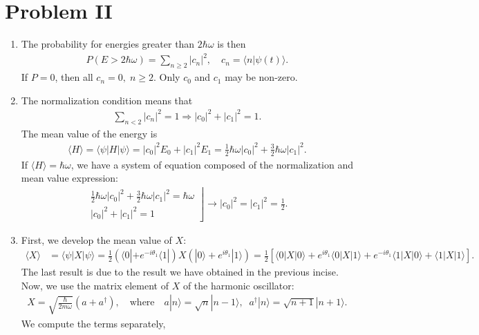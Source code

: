 \documentclass[letterpaper,11pt,twoside]{article}
\newcommand{\ket}[1]{|#1\rangle}
\newcommand{\bra}[1]{\langle#1|}
\newcommand{\braket}[1]{\langle#1\rangle}
\begin{document}
\section*{Problem II}
\begin{enumerate}
  \item The probability for energies greater than $2\hbar\omega$ is then
  \begin{align*}
    P(E>2\hbar\omega)=\sum_{n\geq2}|c_n|^2,\quad c_n=\braket{n|\psi(t)}.
  \end{align*}
  If $P=0$, then all $c_n=0,\;n\geq2$. Only $c_0$ and $c_1$ may be non-zero.
  \item The normalization condition means that 
  \begin{align*}
    \sum_{n<2}|c_n|^2=1\Longrightarrow |c_0|^2+|c_1|^2=1.
  \end{align*}
  The mean value of the energy is
  \begin{align*}
    \braket{H}=\braket{\psi|H|\psi}=|c_0|^2E_0+|c_1|^2E_1=\frac{1}{2}\hbar\omega|c_0|^2+\frac{3}{2}\hbar\omega|c_1|^2.
  \end{align*}
  If $\braket{H}=\hbar\omega$, we have a system of equation composed of the normalization and mean value expression:
  \begin{align*}
    \left.
    \begin{array}{l}
      \displaystyle\frac{1}{2}\hbar\omega|c_0|^2+\frac{3}{2}\hbar\omega|c_1|^2=\hbar\omega\\
      \displaystyle|c_0|^2+|c_1|^2=1
    \end{array}\right\rfloor\longrightarrow
    |c_0|^2=|c_1|^2=\frac{1}{2}.
  \end{align*}
  \item First, we develop the mean value of $X$:
  \begin{align*}
    \braket{X}&=\braket{\psi|X|\psi}=\frac{1}{2}(\bra{0}+e^{-i\theta_1}\bra{1})X(\ket{0}+e^{i\theta_1}\ket{1})=\frac{1}{2}\left[\braket{0|X|0}+e^{i\theta_1}\braket{0|X|1}+e^{-i\theta_1}\braket{1|X|0}+\braket{1|X|1}\right].
  \end{align*}
  The last result is due to the result we have obtained in the previous incise. Now, we use the matrix element of $X$ of the harmonic oscillator:
  \begin{align*}
    X=\sqrt{\frac{\hbar}{2m\omega}}(a+a^\dagger),\quad\text{where}\quad a\ket{n}=\sqrt{n}\ket{n-1},\;\;a^\dagger\ket{n}=\sqrt{n+1}\ket{n+1}.
  \end{align*}
  We compute the terms separately,
  \begin{align*}

\end{align*}
\end{enumerate}
\end{document}
